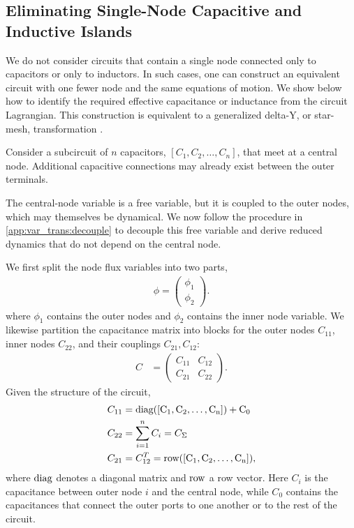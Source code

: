 \subsection{Eliminating Single-Node Capacitive and Inductive Islands}\label{app:details:islands}

We do not consider circuits that contain a single node connected only to capacitors or only to inductors. In such cases, one can construct an equivalent circuit with one fewer node and the same equations of motion. We show below how to identify the required effective capacitance or inductance from the circuit Lagrangian. This construction is equivalent to a generalized delta-Y, or star-mesh, transformation \cite{rosen_new_1924}.


Consider a subcircuit of $n$ capacitors, $[C_1, C_2, \dots, C_n]$, that meet at a central node. Additional capacitive connections may already exist between the outer terminals.

The central-node variable is a free variable, but it is coupled to the outer nodes, which may themselves be dynamical. We now follow the procedure in \cref{app:var_trans:decouple} to decouple this free variable and derive reduced dynamics that do not depend on the central node.

We first split the node flux variables into two parts,
\begin{align*}
\phi = \begin{pmatrix}
    \phi_1 \\
    \phi_2
\end{pmatrix}.
\end{align*}
where $\phi_1$ contains the outer nodes and $\phi_2$ contains the inner node variable. We likewise partition the capacitance matrix into blocks for the outer nodes $C_{11}$, inner nodes $C_{22}$, and their couplings $C_{21}, C_{12}$:
\begin{align*}
    C &= \begin{pmatrix}
    C_{11} & C_{12} \\
    C_{21} & C_{22}
\end{pmatrix}.
\end{align*}
Given the structure of the circuit,
\begin{align}
\begin{split}
    C_{11} &= \rm diag([C_1, C_2, \dots, C_n]) + C_0 \\
    C_{22} &= \sum_{i=1}^n C_i = C_\Sigma \\
    C_{21} &= C_{12}^T = \rm row([C_1, C_2, \dots, C_n]),
\end{split}
\end{align}
where $\rm diag$ denotes a diagonal matrix and $\rm row$ a row vector. Here $C_i$ is the capacitance between outer node $i$ and the central node, while $C_0$ contains the capacitances that connect the outer ports to one another or to the rest of the circuit.

